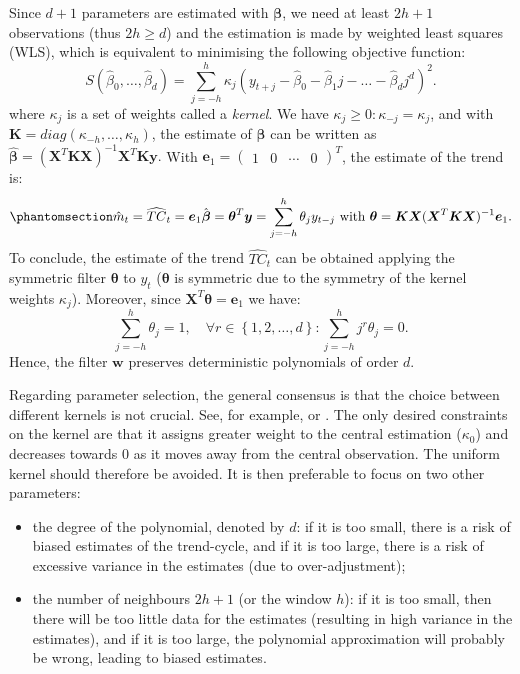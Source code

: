 \documentclass[
]{article}
\newcommand\transp[1]{{#1}^T}
\newcommand\1{\mathds{1}}
\begin{document}
Since \(d+1\) parameters are estimated with \(\boldsymbol \beta\), we
need at least \(2h+1\) observations (thus \(2h\geq d\)) and the
estimation is made by weighted least squares (WLS), which is equivalent
to minimising the following objective function: \[
S(\hat{\beta}_{0},\dots,\hat{\beta}_{d})=\sum_{j=-h}^{h}\kappa_{j}(y_{t+j}-\hat{\beta}_{0}-\hat{\beta}_{1}j-\dots-\hat{\beta}_{d}j^{d})^{2}.
\] where \(\kappa_j\) is a set of weights called a \emph{kernel}. We
have \(\kappa_j\geq 0:\kappa_{-j}=\kappa_j\), and with
\(\boldsymbol K=diag(\kappa_{-h},\dots,\kappa_{h})\), the estimate of
\(\boldsymbol \beta\) can be written as
\(\hat{\boldsymbol\beta}=(\transp{\boldsymbol X}\boldsymbol K\boldsymbol X)^{-1}\transp{\boldsymbol X}\boldsymbol K\boldsymbol y.\)
With
\(\boldsymbol e_1=\transp{\begin{pmatrix}1 &0 &\cdots&0 \end{pmatrix}}\),
the estimate of the trend is:
\begin{equation}\phantomsection\label{eq-mmsym}{
\hat{m}_{t}=\widehat{TC}_t=\boldsymbol e_{1}\hat{\boldsymbol \beta}=\transp{\boldsymbol \theta}\boldsymbol y=\sum_{j=-h}^{h}\theta_{j}y_{t-j}\text{ with }\boldsymbol \theta=\boldsymbol K\boldsymbol X(\transp{\boldsymbol X}\boldsymbol K\boldsymbol X)^{-1}\boldsymbol e_{1}.
}\end{equation} To conclude, the estimate of the trend
\(\widehat{TC}_{t}\) can be obtained applying the symmetric filter
\(\boldsymbol \theta\) to \(y_t\) (\(\boldsymbol \theta\) is symmetric
due to the symmetry of the kernel weights \(\kappa_j\)). Moreover, since
\(\transp{\boldsymbol X}\boldsymbol \theta=\boldsymbol e_{1}\) we have:
\[
\sum_{j=-h}^{h}\theta_{j}=1,\quad\forall r\in\left\{1,2,\dots,d\right\}:\sum_{j=-h}^{h}j^{r}\theta_{j}=0.
\] Hence, the filter \(\boldsymbol w\) preserves deterministic
polynomials of order \(d\).

Regarding parameter selection, the general consensus is that the choice
between different kernels is not crucial. See, for example,
\textcite{cleveland1996smoothing} or \textcite{Loader1999}. The only
desired constraints on the kernel are that it assigns greater weight to
the central estimation (\(\kappa_0\)) and decreases towards 0 as it
moves away from the central observation. The uniform kernel should
therefore be avoided. It is then preferable to focus on two other
parameters:

\begin{itemize}
\item
  the degree of the polynomial, denoted by \(d\): if it is too small,
  there is a risk of biased estimates of the trend-cycle, and if it is
  too large, there is a risk of excessive variance in the estimates (due
  to over-adjustment);
\item
  the number of neighbours \(2h+1\) (or the window \(h\)): if it is too
  small, then there will be too little data for the estimates (resulting
  in high variance in the estimates), and if it is too large, the
  polynomial approximation will probably be wrong, leading to biased
  estimates.
\end{itemize}
\end{document}
